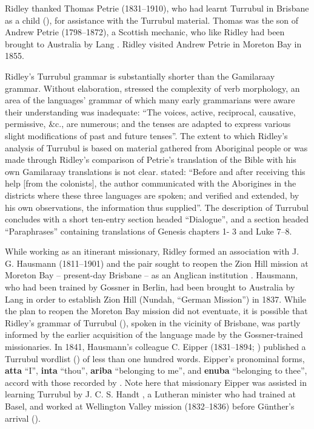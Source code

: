 Ridley thanked Thomas Petrie (1831--1910), who had learnt Turrubul in Brisbane as a child (), for assistance with the Turrubul material. Thomas was the son of Andrew Petrie (1798--1872), a Scottish mechanic, who like Ridley had been brought to Australia by Lang \citep{hall_petrie_1974}. Ridley visited Andrew Petrie in Moreton Bay in 1855.

Ridley’s Turrubul grammar is substantially shorter than the Gamilaraay grammar. Without elaboration, \citet[63]{ridley_kamilaroi_1866} stressed the complexity of verb morphology, an area of the languages' grammar of which many early grammarians were aware their understanding was inadequate: “The voices, active, reciprocal, causative, permissive, \&c., are numerous; and the tenses are adapted to express various slight modifications of past and future tenses”. The extent to which Ridley’s analysis of Turrubul is based on material gathered from Aboriginal people or was made through Ridley’s comparison of Petrie’s translation of the Bible with his own Gamilaraay translations is not clear. \citet[vi]{ridley_kamilaroi_1866} stated: “Before and after receiving this help [from the colonists], the author communicated with the Aborigines in the districts where these three languages are spoken; and verified and extended, by his own observations, the information thus supplied”. The description of Turrubul concludes with a short ten-entry section headed ``Dialogue'', and a section headed “Paraphrases” containing translations of Genesis chapters 1- 3 and Luke 7--8. 

While working as an itinerant missionary, Ridley formed an association with J. G. Hausmann (1811--1901) and the pair sought to reopen the Zion Hill mission at Moreton Bay – present-day Brisbane – as an Anglican institution \citep[233--234]{harris_one_1994}. Hausmann, who had been trained by Gossner in Berlin, had been brought to Australia by Lang in order to establish Zion Hill (Nundah, ``German Mission'') in 1837. While the plan to reopen the Moreton Bay mission did not eventuate, it is possible that Ridley’s grammar of Turrubul (\citeyear{ridley_kamilaroi_1866}), spoken in the vicinity of Brisbane, was partly informed by the earlier acquisition of the language made by the Gossner-trained missionaries. In 1841, Hausmann’s colleague C. Eipper (1831--1894; \citeyear{eipper_statement_1841}) published a Turrubul wordlist (\citeyear[11]{eipper_statement_1841}) of less than one hundred words. Eipper’s pronominal forms, \textbf{atta} ``I'', \textbf{inta} ``thou'', \textbf{ariba} ``belonging to me'', and \textbf{enuba} ``belonging to thee'', accord with those recorded by \citet[62]{ridley_kamilaroi_1866}. Note here that missionary Eipper was assisted in learning Turrubul by J. C. S. Handt \citep{ganter_eipper_2016}, a Lutheran minister who had trained at Basel, and worked at Wellington Valley mission (1832--1836) before Günther’s arrival ().

